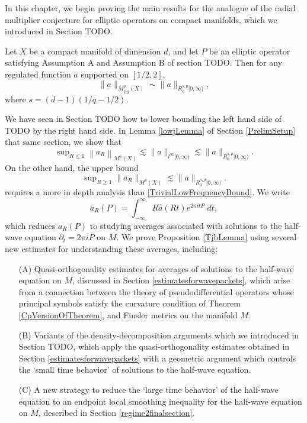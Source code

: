 
In this chapter, we begin proving the main results for the analogue of the radial multiplier conjecture for elliptic operators on compact manifolds, which we introduced in Section TODO.

\begin{theorem} \label{CpVersionOfTheorem}
    Let $X$ be a compact manifold of dimension $d$, and let $P$ be an elliptic operator satisfying Assumption A and Assumption B of section TODO. Then for any regulated function $a$ supported on $[1/2,2]$,
    \[ \| a \|_{M^p_{\text{Dil}}(X)} \sim \| a \|_{R^{s,p}_0[0,\infty)}, \]
    where $s = (d-1)(1/q - 1/2)$.
\end{theorem}

We have seen in Section TODO how to lower bounding the left hand side of TODO by the right hand side. In Lemma \ref{lowjLemma} of Section \ref{PrelimSetup} that same section, we show that
%
\begin{equation} \label{TrivialLowFrequencyBound}
    \sup\nolimits_{R \leq 1} \left\| a_R \right\|_{M^p(X)} \lesssim \| a \|_{l^\infty[0,\infty)} \lesssim \| a \|_{R^{s,p}_0[0,\infty)}.
\end{equation}
%
On the other hand, the upper bound
%
\begin{equation} \label{dyadicMainReulst}
    \sup\nolimits_{R \geq 1} \| a_R \|_{M^p(X)} \lesssim \| a \|_{R^{s,p}_0[0,\infty)}.
\end{equation}
%
requires a more in depth analysis than \eqref{TrivialLowFrequencyBound}. We write
%
\begin{equation}
    a_R(P) = \int_{-\infty}^\infty R \widehat{a}(Rt) e^{2 \pi i t P}\; dt,
\end{equation}
%
which reduces $a_R(P)$ to studying averages associated with solutions to the half-wave equation $\partial_t = 2 \pi i P$ on $M$. We prove Proposition \ref{TjbLemma} using several new estimates for understanding these averages, including:
%
\begin{itemize}
    \item[(A)] Quasi-orthogonality estimates for averages of solutions to the half-wave equation on $M$, discussed in Section \ref{estimatesforwavepackets}, which arise from a connection between the theory of pseudodifferential operators whose principal symbols satisfy the curvature condition of Theorem \ref{CpVersionOfTheorem}, and Finsler metrics on the manifold $M$.

    \item[(B)] Variants of the density-decomposition arguments which we introduced in Section TODO, which apply the quasi-orthogonality estimates obtained in Section \ref{estimatesforwavepackets} with a geometric argument which controls the `small time behavior' of solutions to the half-wave equation.

    \item[(C)] A new strategy to reduce the `large time behavior' of the half-wave equation to an endpoint local smoothing inequality for the half-wave equation on $M$, described in Section \ref{regime2finalsection}.
\end{itemize}
